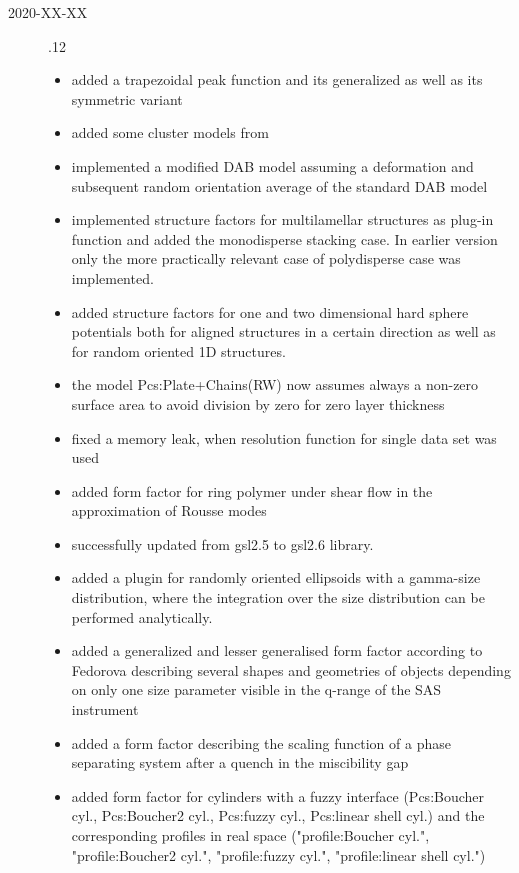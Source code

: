 \begin{description}
\item[2020-XX-XX] .12
    \begin{itemize}
    \item added a trapezoidal peak function and its generalized as well as its symmetric variant
    \item added some cluster models from \cite{Larsen2020}
    \item implemented a modified DAB model assuming a deformation and subsequent random orientation average of the standard DAB model
    \item implemented structure factors for multilamellar structures as plug-in function and added the monodisperse stacking case. In earlier version only the more practically relevant case of polydisperse case was implemented.
    \item added structure factors for one and two dimensional hard sphere potentials both for aligned structures in a certain direction as well as for random oriented 1D structures.
    \item the model Pcs:Plate+Chains(RW) now assumes always a non-zero surface area to avoid division by zero for zero layer thickness
    \item fixed a memory leak, when resolution function for single data set was used
    \item added form factor for ring polymer under shear flow in the approximation of Rousse modes
    \item successfully updated from gsl2.5 to gsl2.6 library.
    \item added a plugin for randomly oriented ellipsoids with a gamma-size distribution, where the integration over the size distribution can be performed analytically.
    \item added a generalized and lesser generalised form factor according to Fedorova describing several shapes and geometries of objects depending on only one size parameter visible in the q-range of the SAS instrument
    \item added a form factor describing the scaling function of a phase separating system after a quench in the miscibility gap
    \item added form factor for cylinders with a fuzzy interface (Pcs:Boucher cyl., Pcs:Boucher2 cyl., Pcs:fuzzy cyl., Pcs:linear shell cyl.) and the corresponding profiles in real space ("profile:Boucher cyl.", "profile:Boucher2 cyl.", "profile:fuzzy cyl.", "profile:linear shell cyl.")

\end{itemize}
\end{description}

